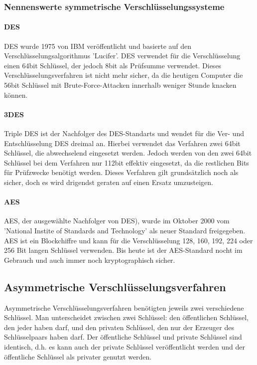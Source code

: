 \documentclass[11pt,a4paper]{report}
\begin{document}
\subsubsection{Nennenswerte symmetrische Verschlüsselungssysteme}

\paragraph{DES}

DES wurde 1975 von IBM veröffentlicht und basierte auf den Verschlüsselungsalgorithmus 'Lucifer'. DES verwendet für die Verschlüsselung einen 64bit Schlüssel, der jedoch 8bit als Prüfsumme verwendet. Dieses Verschlüsselungsverfahren ist nicht mehr sicher, da die heutigen Computer die 56bit Schlüssel mit Brute-Force-Attacken innerhalb weniger Stunde knacken können.

\paragraph{3DES}

Triple DES ist der Nachfolger des DES-Standarts und wendet für die Ver- und Entschlüsselung DES dreimal an. Hierbei verwendet das Verfahren zwei 64bit Schlüssel, die abwechselend eingesetzt werden. Jedoch werden von den zwei 64bit Schlüssel bei dem Verfahren nur 112bit effektiv eingesetzt, da die restlichen Bits für Prüfzwecke benötigt werden. Dieses Verfahren gilt grundsätzlich noch als sicher,
doch es wird drigendst geraten auf einen Ersatz umzusteigen.

\paragraph{AES}

AES, der ausgewählte Nachfolger von DES), wurde im Oktober 2000 vom 'National Instite of Standards and Technology' als neuer Standard freigegeben. AES ist ein Blockchiffre und kann für die Verschlüsselung 128, 160, 192, 224 oder 256 Bit langen Schlüssel verwenden. Bis heute ist der AES-Standard nocht im Gebrauch und auch immer noch kryptographisch sicher.

\subsection{Asymmetrische Verschlüsselungsverfahren}

Asymmetrische Verschlüsselungsverfahren benötigten jeweils zwei verschiedene Schlüssel. Man unterscheidet zwischen zwei Schlüssel: den öffentlichen Schlüssel, den jeder haben darf, und den privaten Schlüssel, den nur der Erzeuger des Schlüsselpaars haben darf. Der öffentliche Schlüssel und private Schlüssel sind identisch, d.h. es kann auch der private Schlüssel veröffentlicht werden und der öffentliche Schlüssel als privater genutzt werden.
\end{document}
